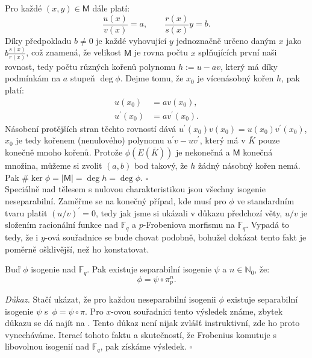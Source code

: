 \documentclass[12pt]{report}
\begin{document}
Pro každé $(x,y) \in \mathsf{M}$ dále platí:
\begin{equation*}
\frac{u(x)}{v(x)} = a, \qquad \frac{r(x)}{s(x)}y = b.
\end{equation*}
Díky předpokladu $b \neq 0$ je každé vyhovující $y$ jednoznačně určeno daným $x$ jako $b \frac{s(x)}{r(x)}$, což znamená, že velikost $\mathsf{M}$ je rovna počtu $x$ splňujících první naši rovnost, tedy počtu různých kořenů polynomu $h:= u - av$, který má díky podmínkám na $a$ stupeň $\deg \phi$. Dejme tomu, že $x_0$ je vícenásobný kořen $h$, pak platí:
\begin{align*}
u(x_0) &= a v(x_0),\\
u^{\prime} (x_0)  &=  a v^{\prime} (x_0).
\end{align*}  
Násobení protějších stran těchto rovností dává $u^{\prime} (x_0) v (x_0) = u (x_0) v^{\prime} (x_0)$, $x_0$ je tedy kořenem (nenulového) polynomu $u^\prime v - u v^\prime$, který má v $\overline{K}$ pouze konečně mnoho kořenů. Protože $\phi(E(\overline{K}))$ je nekonečná a $\mathsf{M}$ konečná množina, můžeme si zvolit $(a,b)$ bod takový, že $h$ žádný násobný kořen nemá. Pak $\# \ker \phi = \vert \mathsf{M}\vert = \deg h = \deg \phi$. \hfill $\square$\\

Speciálně nad tělesem s nulovou charakteristikou jsou všechny isogenie neseparabilní. Zaměřme se na konečný případ, kde musí pro $\phi$ ve standardním tvaru platit $(u/v)^\prime =0$, tedy jak jsme si ukázali v důkazu předchozí věty, $u/v$ je složením racionální funkce nad $\mathbb{F}_q$ a $p$-Frobeniova morfismu na $\mathbb{F}_q$. Vypadá to tedy, že i $y$-ová souřadnice se bude chovat podobně, bohužel dokázat tento fakt je poměrně ošklivější, než ho konstatovat. 

\begin{dusledek}\label{separ2}
Buď $\phi$ isogenie nad $\mathbb{F}_q$. Pak existuje separabilní isogenie $\psi$ a $n \in \mathbb{N}_0$, že:
\begin{equation*}
\phi = \psi \circ \pi_p ^n.
\end{equation*}
\end{dusledek}

\noindent \textit{Důkaz.} Stačí ukázat, že pro každou neseparabilní isogenii $\phi$ existuje separabilní isogenie $\psi$ s~$\phi = \psi \circ \pi$. Pro $x$-ovou souřadnici tento výsledek známe, zbytek důkazu se dá najít na \cite[Lemma 6.3.]{Sutherland}. Tento důkaz není nijak zvlášť instruktivní, zde ho proto vynecháváme. Iterací tohoto faktu a skutečností, že Frobenius komutuje s libovolnou isogenií nad $\mathbb{F}_q$, pak získáme výsledek. \hfill $\square$\\
\end{document}
